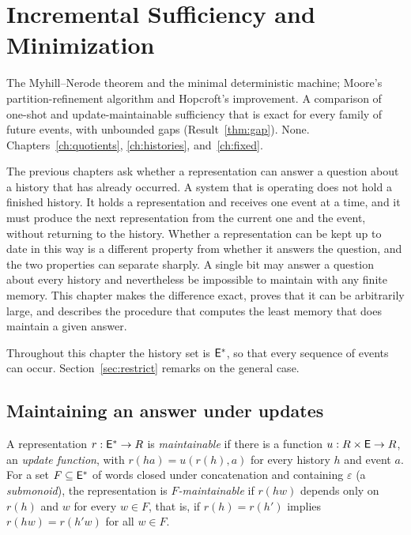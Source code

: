 \chapter{Incremental Sufficiency and Minimization}\label{ch:incremental}
{The Myhill--Nerode theorem and the minimal deterministic machine; Moore's partition-refinement algorithm and Hopcroft's improvement.}
{A comparison of one-shot and update-maintainable sufficiency that is exact for every family of future events, with unbounded gaps (Result~\ref{thm:gap}).}
{None.}
{Chapters~\ref{ch:quotients}, \ref{ch:histories}, and~\ref{ch:fixed}.}

The previous chapters ask whether a representation can answer a question about a history that has already occurred. A system that is operating does not hold a finished history. It holds a representation and receives one event at a time, and it must produce the next representation from the current one and the event, without returning to the history. Whether a representation can be kept up to date in this way is a different property from whether it answers the question, and the two properties can separate sharply. A single bit may answer a question about every history and nevertheless be impossible to maintain with any finite memory. This chapter makes the difference exact, proves that it can be arbitrarily large, and describes the procedure that computes the least memory that does maintain a given answer.

Throughout this chapter the history set is $\mathsf{E}^{*}$, so that every sequence of events can occur. Section~\ref{sec:restrict} remarks on the general case.

\section{Maintaining an answer under updates}

\begin{definition}\label{def:maintainable}
A representation $r:\mathsf{E}^{*}\to R$ is \emph{maintainable} if there is a function $u:R\times\mathsf{E}\to R$, an \emph{update function}, with $r(ha)=u(r(h),a)$ for every history $h$ and event $a$. For a set $F\subseteq\mathsf{E}^{*}$ of words closed under concatenation and containing $\varepsilon$ (a \emph{submonoid}), the representation is \emph{$F$-maintainable} if $r(hw)$ depends only on $r(h)$ and $w$ for every $w\in F$, that is, if $r(h)=r(h')$ implies $r(hw)=r(h'w)$ for all $w\in F$.
\end{definition}

